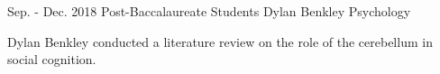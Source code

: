 \begin{cventries}
  \cventry
    {Sep. - Dec. 2018} %
    {Post-Baccalaureate Students} %
    {Dylan Benkley}
    {Psychology}
   {
      \begin{cvitems} %
        \item {Dylan Benkley conducted a literature review on the role of the cerebellum in social cognition.}
      \end{cvitems}
    }

\end{cventries}
